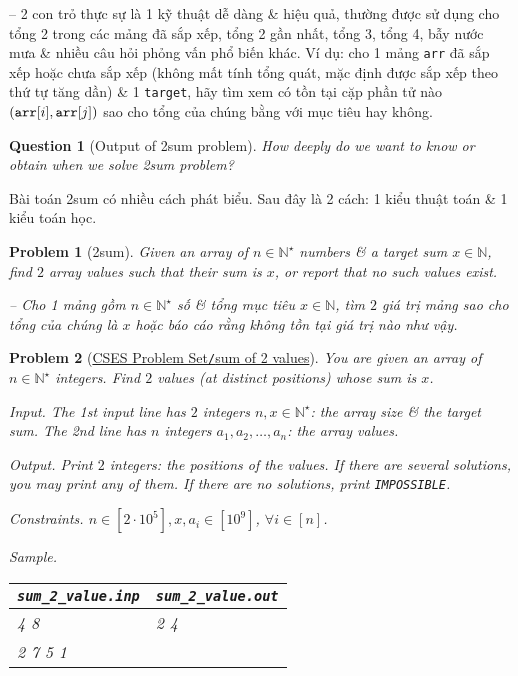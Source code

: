 \documentclass{article}
\newtheorem{problem}{Problem}
\newtheorem{question}{Question}
\begin{document}
-- 2 con trỏ thực sự là 1 kỹ thuật dễ dàng \& hiệu quả, thường được sử dụng cho tổng 2 trong các mảng đã sắp xếp, tổng 2 gần nhất, tổng 3, tổng 4, bẫy nước mưa \& nhiều câu hỏi phỏng vấn phổ biến khác. Ví dụ: cho 1 mảng {\tt arr} đã sắp xếp hoặc chưa sắp xếp (không mất tính tổng quát, mặc định được sắp xếp theo thứ tự tăng dần) \& 1 {\tt target}, hãy tìm xem có tồn tại cặp phần tử nào $({\tt arr}[i],{\tt arr}[j])$ sao cho tổng của chúng bằng với mục tiêu hay không.

\begin{question}[Output of {\sf2sum} problem]
    How deeply do we want to know or obtain when we solve {\sc2sum} problem?
\end{question}
Bài toán {\sc2sum} có nhiều cách phát biểu. Sau đây là 2 cách: 1 kiểu thuật toán \& 1 kiểu toán học.

\begin{problem}[{\sc2sum}]
    Given an array of $n\in\mathbb{N}^\star$ numbers \& a target sum $x\in\mathbb{N}$, find $2$ array values such that their sum is $x$, or report that no such values exist.

    -- Cho 1 mảng gồm $n\in\mathbb{N}^\star$ số \& tổng mục tiêu $x\in\mathbb{N}$, tìm $2$ giá trị mảng sao cho tổng của chúng là $x$ hoặc báo cáo rằng không tồn tại giá trị nào như vậy.
\end{problem}

\begin{center}
\end{center}

\begin{problem}[\href{https://cses.fi/problemset/task/1640}{CSES Problem Set{\tt/}sum of 2 values}]
    You are given an array of $n\in\mathbb{N}^\star$ integers. Find $2$ values (at distinct positions) whose sum is $x$.
    \item {\sf Input.} The 1st input line has $2$ integers $n,x\in\mathbb{N}^\star$: the array size \& the target sum. The 2nd line has $n$ integers $a_1,a_2,\ldots,a_n$: the array values.
    \item {\sf Output.} Print $2$ integers: the positions of the values. If there are several solutions, you may print any of them. If there are no solutions, print {\tt IMPOSSIBLE}.
    \item {\sf Constraints.} $n\in[2\cdot10^5],x,a_i\in[10^9]$, $\forall i\in[n]$.
    \item {\sf Sample.}
    \begin{table}[H]
        \centering
        \begin{tabular}{|l|l|}
            \hline
            \verb|sum_2_value.inp| & \verb|sum_2_value.out| \\
            \hline
            4 8 & 2 4 \\
            2 7 5 1 & \\
            \hline
        \end{tabular}
    \end{table}
\end{problem}
\end{document}

